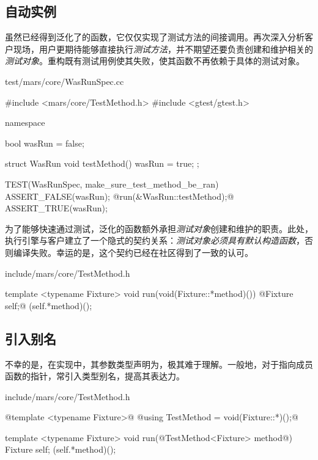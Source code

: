 \begin{content}
\subsection{自动实例}

虽然已经得到泛化了的函数，它仅仅实现了测试方法的间接调用。再次深入分析客户现场，用户更期待能够直接执行\emph{测试方法}，并不期望还要负责创建和维护相关的\emph{测试对象}。重构既有测试用例使其失败，使其函数不再依赖于具体的测试对象。

\begin{nodiff}{test/mars/core/WasRunSpec.cc}
\begin{c++}
#include <mars/core/TestMethod.h>
#include <gtest/gtest.h>

namespace {
  bool wasRun = false;

  struct WasRun {
    void testMethod() {
      wasRun = true;
    }
  };
}

TEST(WasRunSpec, make_sure_test_method_be_ran) {
  ASSERT_FALSE(wasRun);
  @run(&WasRun::testMethod);@
  ASSERT_TRUE(wasRun);
}
\end{c++}
\end{nodiff}

为了能够快速通过测试，泛化的函数额外承担\emph{测试对象}创建和维护的职责。此处，执行引擎与客户建立了一个隐式的契约关系：\emph{测试对象必须具有默认构造函数}，否则编译失败。幸运的是，这个契约已经在社区得到了一致的认可。

\begin{nodiff}{include/mars/core/TestMethod.h}
\begin{c++}
template <typename Fixture>
void run(void(Fixture::*method)()) {
  @Fixture self;@
  (self.*method)();
}
\end{c++}
\end{nodiff}

\subsection{引入别名}

不幸的是，在实现中，其参数类型声明为，极其难于理解。一般地，对于指向成员函数的指针，常引入类型别名，提高其表达力。

\begin{nodiff}{include/mars/core/TestMethod.h}
\begin{c++}
@template <typename Fixture>@
@using TestMethod = void(Fixture::*)();@

template <typename Fixture>
void run(@TestMethod<Fixture> method@) {
  Fixture self;
  (self.*method)();
}
\end{c++}
\end{nodiff}


\end{content}

